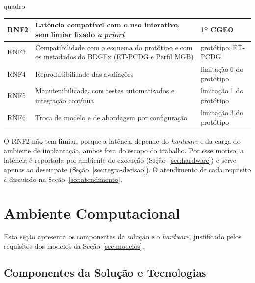 \begin{fixo}{quadro}
\begin{tabular}{|>{\centering\arraybackslash}p{1.2cm}|>{\raggedright\arraybackslash}p{9.0cm}|>{\raggedright\arraybackslash}p{4.4cm}|}
RNF2 & Latência compatível com o uso interativo, sem limiar fixado \textit{a priori} & 1º CGEO \\ \hline
RNF3 & Compatibilidade com o esquema do protótipo e com os metadados do BDGEx (ET-PCDG e Perfil MGB) & protótipo; ET-PCDG \\ \hline
RNF4 & Reprodutibilidade das avaliações & limitação 6 do protótipo \\ \hline
RNF5 & Manutenibilidade, com testes automatizados e integração contínua & limitação 1 do protótipo \\ \hline
RNF6 & Troca de modelo e de abordagem por configuração & limitação 3 do protótipo \\ \hline
\end{tabular}
\end{fixo}

O RNF2 não tem limiar, porque a latência depende do \textit{hardware} e da carga do ambiente de implantação, ambos fora do escopo do trabalho. Por esse motivo, a latência é reportada por ambiente de execução (Seção~\ref{sec:hardware}) e serve apenas ao desempate (Seção~\ref{sec:regra-decisao}). O atendimento de cada requisito é discutido na Seção~\ref{sec:atendimento}.

\section{Ambiente Computacional}
\label{sec:ambiente}

Esta seção apresenta os componentes da solução e o \textit{hardware}, justificado pelos requisitos dos modelos da Seção~\ref{sec:modelos}.

\subsection{Componentes da Solução e Tecnologias}
\label{sec:componentes}

